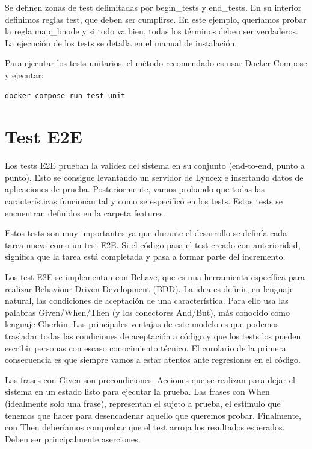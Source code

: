 \documentclass[12pt]{report} %
\begin{document}
Se definen zonas de test delimitadas por begin_tests y end_tests. En su interior definimos reglas test, que deben ser cumplirse. En este ejemplo, queríamos probar la regla map_bnode y si todo va bien, todas los términos deben ser verdaderos. La ejecución de los tests se detalla en el manual de instalación.

Para ejecutar los tests unitarios, el método recomendado es usar Docker Compose y ejecutar:

\begin{verbatim}
docker-compose run test-unit
\end{verbatim}

\section{Test E2E}

Los tests E2E prueban la validez del sistema en su conjunto (end-to-end, punto a punto). Esto se consigue levantando un servidor de Lyncex e insertando datos de aplicaciones de prueba. Posteriormente, vamos probando que todas las características funcionan tal y como se especificó en los tests. Estos tests se encuentran definidos en la carpeta features.

Estos tests son muy importantes ya que durante el desarrollo se definía cada tarea nueva como un test E2E. Si el código pasa el test creado con anterioridad, significa que la tarea está completada y pasa a formar parte del incremento.

Los test E2E se implementan con Behave, que es una herramienta específica para realizar Behaviour Driven Development (BDD). La idea es definir, en lenguaje natural, las condiciones de aceptación de una característica. Para ello usa las palabras Given/When/Then (y los conectores And/But), más conocido como lenguaje Gherkin. Las principales ventajas de este modelo es que podemos trasladar todas las condiciones de aceptación a código y que los tests los pueden escribir personas con escaso conocimiento técnico. El corolario de la primera consecuencia es que siempre vamos a estar atentos ante regresiones en el código.

Las frases con Given son precondiciones. Acciones que se realizan para dejar el sistema en un estado listo para ejecutar la prueba. Las frases con When (idealmente solo una frase), representan el sujeto a prueba, el estímulo que tenemos que hacer para desencadenar aquello que queremos probar. Finalmente, con Then deberíamos comprobar que el test arroja los resultados esperados. Deben ser principalmente aserciones.
\end{document}
